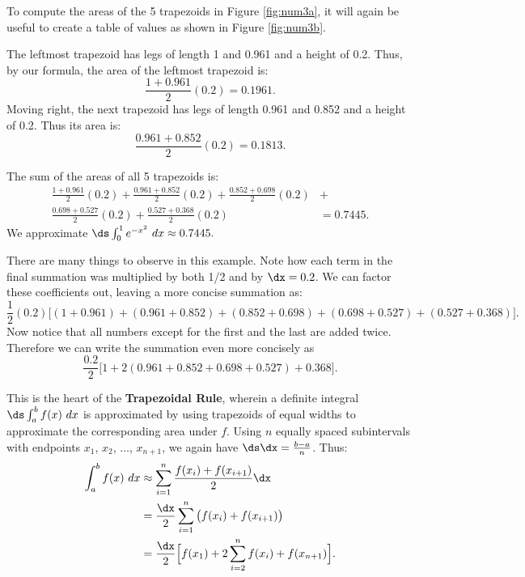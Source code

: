 {To compute the areas of the 5 trapezoids in Figure \ref{fig:num3a}, it will again be useful to create a table of values as shown in Figure \ref{fig:num3b}.


The leftmost trapezoid has legs of length 1 and 0.961 and a height of 0.2. Thus, by our formula, the area of the leftmost trapezoid is: $$ \frac{1+0.961}{2}(0.2) = 0.1961.$$
Moving right, the next trapezoid has legs of length 0.961 and 0.852 and a height of 0.2. Thus its area is: $$\frac{0.961+0.852}2(0.2) = 0.1813.$$

The sum of the areas of all 5 trapezoids is:
\begin{align*}
\frac{1+0.961}{2}(0.2) + \frac{0.961+0.852}2(0.2)+\frac{0.852+0.698}2(0.2)&+ \\
\frac{0.698+0.527}2(0.2)+\frac{0.527+0.368}2(0.2)&= 0.7445.
\end{align*}
We approximate $\ds \int_0^1 e^{-x^2}\ dx \approx 0.7445.$}

There are many things to observe in this example. Note how each term in the final summation was multiplied by both 1/2 and by $\dx = 0.2$. We can factor these coefficients out, leaving a more concise summation as:\small
$$
\frac12(0.2)\Big[(1+0.961) + (0.961+0.852) + (0.852+0.698) + ( 0.698+ 0.527) +(0.527 + 0.368)\Big].$$
\normalsize
Now notice that all numbers except for the first and the last are added twice. Therefore we can write the summation even more concisely as
$$\frac{0.2}{2}\Big[1 + 2(0.961+0.852+0.698+0.527) + 0.368\Big].$$

This is the heart of the \textbf{Trapezoidal Rule}, wherein a definite integral $\ds \int_a^b f(x) \ dx$ is approximated by using trapezoids of equal widths to approximate the corresponding area under $f$. Using $n$ equally spaced subintervals with endpoints $x_1$, $x_2$, $\ldots$, $x_{n+1}$, we again have $\ds \dx = \frac{b-a}n$. Thus:
\begin{align*}
\int_a^b f(x)\ dx & \approx \sum_{i=1}^n \frac{f(x_i)+f(x_{i+1})}2\dx \\
									& = \frac{\dx}2 \sum_{i=1}^n \big(f(x_i)+f(x_{i+1})\big)\\
									& = \frac{\dx}2\Big[f(x_1)+ 2\sum_{i=2}^n f(x_i) + f(x_{n+1})\Big].\\ 
\end{align*}

